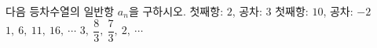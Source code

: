 다음 등차수열의 일반항 $a_n$을 구하시오.
 첫째항: $2$, 공차: $3$
 첫째항: $10$, 공차: $-2$
 $1,\ 6,\ 11,\ 16,\ \cdots$
 $3,\ \dfrac{8}{3},\ \dfrac{7}{3},\ 2,\ \cdots$
